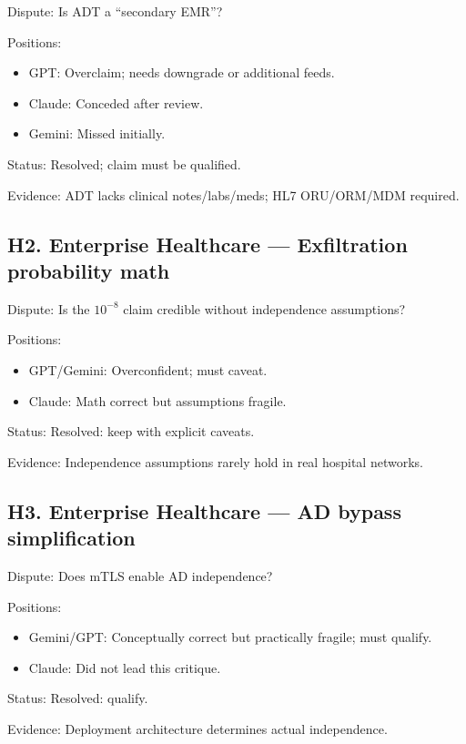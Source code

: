 \documentclass[11pt,letterpaper]{article}
\begin{document}
\begin{reflist}
\item[Dispute:] Is ADT a ``secondary EMR''?
\item[Positions:]~
  \begin{itemize}[nosep]
    \item GPT: Overclaim; needs downgrade or additional feeds.
    \item Claude: Conceded after review.
    \item Gemini: Missed initially.
  \end{itemize}
\item[Status:] Resolved; claim must be qualified.
\item[Evidence:] ADT lacks clinical notes/labs/meds; HL7 ORU/ORM/MDM required.
\end{reflist}

\subsection{H2. Enterprise Healthcare --- Exfiltration probability math}

\begin{reflist}
\item[Dispute:] Is the $10^{-8}$ claim credible without independence assumptions?
\item[Positions:]~
  \begin{itemize}[nosep]
    \item GPT/Gemini: Overconfident; must caveat.
    \item Claude: Math correct but assumptions fragile.
  \end{itemize}
\item[Status:] Resolved: keep with explicit caveats.
\item[Evidence:] Independence assumptions rarely hold in real hospital networks.
\end{reflist}

\subsection{H3. Enterprise Healthcare --- AD bypass simplification}

\begin{reflist}
\item[Dispute:] Does mTLS enable AD independence?
\item[Positions:]~
  \begin{itemize}[nosep]
    \item Gemini/GPT: Conceptually correct but practically fragile; must qualify.
    \item Claude: Did not lead this critique.
  \end{itemize}
\item[Status:] Resolved: qualify.
\item[Evidence:] Deployment architecture determines actual independence.
\end{reflist}
\end{document}
